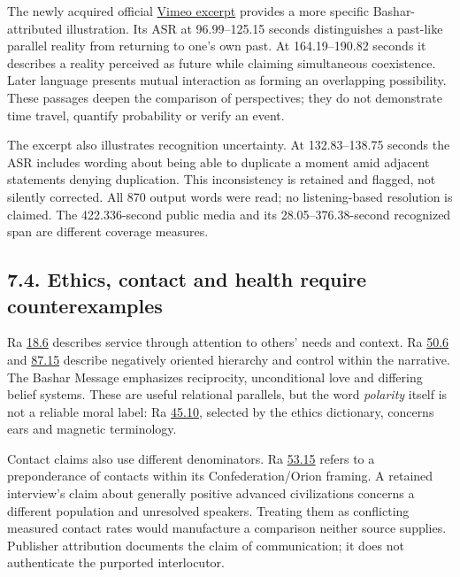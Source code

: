 \documentclass[
  11pt,
]{article}
\begin{document}
The newly acquired official \href{https://vimeo.com/392834325}{Vimeo
excerpt} provides a more specific Bashar-attributed illustration. Its
ASR at 96.99--125.15 seconds distinguishes a past-like parallel reality
from returning to one's own past. At 164.19--190.82 seconds it describes
a reality perceived as future while claiming simultaneous coexistence.
Later language presents mutual interaction as forming an overlapping
possibility. These passages deepen the comparison of perspectives; they
do not demonstrate time travel, quantify probability or verify an event.

The excerpt also illustrates recognition uncertainty. At 132.83--138.75
seconds the ASR includes wording about being able to duplicate a moment
amid adjacent statements denying duplication. This inconsistency is
retained and flagged, not silently corrected. All 870 output words were
read; no listening-based resolution is claimed. The 422.336-second
public media and its 28.05--376.38-second recognized span are different
coverage measures.

\FloatBarrier

\subsection{7.4. Ethics, contact and health require
counterexamples}\label{ethics-contact-and-health-require-counterexamples}

Ra \href{https://www.lawofone.info/s/18\#18.6}{18.6} describes service
through attention to others' needs and context. Ra
\href{https://www.lawofone.info/s/50\#50.6}{50.6} and
\href{https://www.lawofone.info/s/87\#87.15}{87.15} describe negatively
oriented hierarchy and control within the narrative. The Bashar Message
emphasizes reciprocity, unconditional love and differing belief systems.
These are useful relational parallels, but the word \emph{polarity}
itself is not a reliable moral label: Ra
\href{https://www.lawofone.info/s/45\#45.10}{45.10}, selected by the
ethics dictionary, concerns ears and magnetic terminology.

Contact claims also use different denominators. Ra
\href{https://www.lawofone.info/s/53\#53.15}{53.15} refers to a
preponderance of contacts within its Confederation/Orion framing. A
retained interview's claim about generally positive advanced
civilizations concerns a different population and unresolved speakers.
Treating them as conflicting measured contact rates would manufacture a
comparison neither source supplies. Publisher attribution documents the
claim of communication; it does not authenticate the purported
interlocutor.
\end{document}
